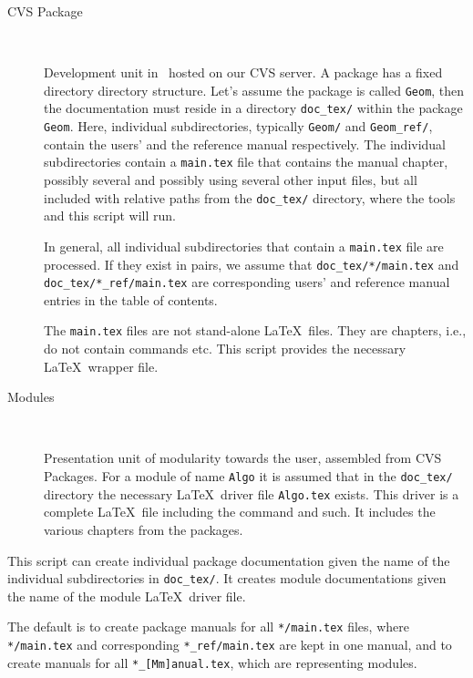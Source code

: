\begin{description}
  \item[CVS Package]~
 
     Development unit in \cgal\ hosted on our CVS server. A package has a 
     fixed directory directory structure. Let's assume the package is 
     called \texttt{Geom}, then the documentation must reside in a directory
     \texttt{doc\_tex/} within the package \texttt{Geom}. Here,
     individual subdirectories, typically \texttt{Geom/} and
     \texttt{Geom\_ref/}, contain the users' and the reference 
     manual respectively. The individual subdirectories contain a 
     \texttt{main.tex} file that contains the manual chapter, possibly
     several and possibly using several other input files, but all
     included with relative paths from the \texttt{doc\_tex/}
     directory, where the tools and this script will run.
     
     In general, all individual subdirectories that contain a 
     \texttt{main.tex} file are processed. If they exist in pairs, we
     assume that \texttt{doc\_tex/*/main.tex} and
     \texttt{doc\_tex/*\_ref/main.tex} are corresponding users' and
     reference manual entries in the table of contents.

     The \texttt{main.tex} files are not stand-alone \LaTeX\ files. They are
     chapters, i.e., do not contain \verb|| commands
     etc. This script provides the necessary \LaTeX\ wrapper file.

   \item[Modules]~
 
     Presentation unit of modularity towards the user, assembled from
     CVS Packages. For a module of name \texttt{Algo} it is assumed
     that in the \texttt{doc\_tex/} directory  the necessary \LaTeX\
     driver file \texttt{Algo.tex} exists.
     This driver is a complete \LaTeX\ file including the
     \verb|| command and such. It includes the various
     chapters from the packages.
\end{description}

 This script can create individual package documentation given the name of
 the individual subdirectories in \texttt{doc\_tex/}. It creates module 
 documentations given the name of the module \LaTeX\ driver file.
 
 The default is to create package manuals for all \texttt{*/main.tex} files,
 where \texttt{*/main.tex} and corresponding \texttt{*\_ref/main.tex}
 are kept in one manual, and to create manuals for all
 \texttt{*\_[Mm]anual.tex}, which are representing modules.
 
